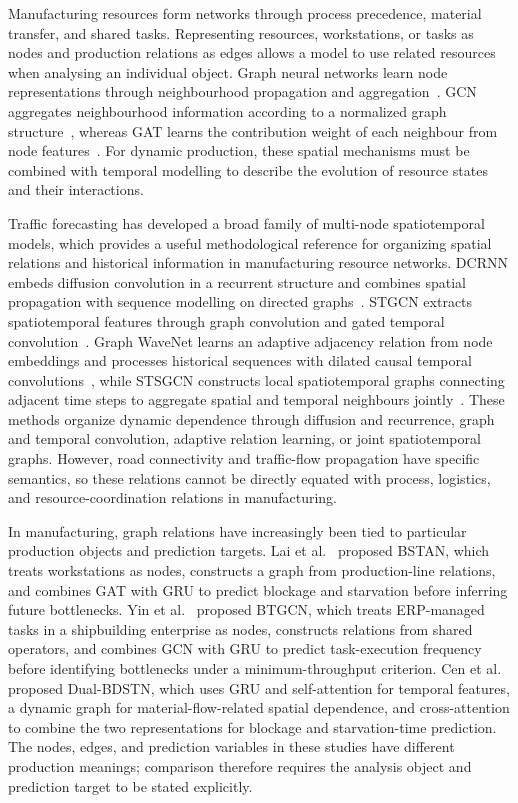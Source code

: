 \documentclass[a4paper,fleqn]{cas-dc}
\begin{document}
Manufacturing resources form networks through process precedence, material transfer, and shared tasks. Representing resources, workstations, or tasks as nodes and production relations as edges allows a model to use related resources when analysing an individual object. Graph neural networks learn node representations through neighbourhood propagation and aggregation~\cite{wu2021gnn}. GCN aggregates neighbourhood information according to a normalized graph structure~\cite{kipf2017gcn}, whereas GAT learns the contribution weight of each neighbour from node features~\cite{velickovic2018gat}. For dynamic production, these spatial mechanisms must be combined with temporal modelling to describe the evolution of resource states and their interactions.


Traffic forecasting has developed a broad family of multi-node spatiotemporal models, which provides a useful methodological reference for organizing spatial relations and historical information in manufacturing resource networks. DCRNN embeds diffusion convolution in a recurrent structure and combines spatial propagation with sequence modelling on directed graphs~\cite{li2018dcrnn}. STGCN extracts spatiotemporal features through graph convolution and gated temporal convolution~\cite{yu2018stgcn}. Graph WaveNet learns an adaptive adjacency relation from node embeddings and processes historical sequences with dilated causal temporal convolutions~\cite{wu2019graphwavenet}, while STSGCN constructs local spatiotemporal graphs connecting adjacent time steps to aggregate spatial and temporal neighbours jointly~\cite{song2020stsgcn}. These methods organize dynamic dependence through diffusion and recurrence, graph and temporal convolution, adaptive relation learning, or joint spatiotemporal graphs. However, road connectivity and traffic-flow propagation have specific semantics, so these relations cannot be directly equated with process, logistics, and resource-coordination relations in manufacturing.


In manufacturing, graph relations have increasingly been tied to particular production objects and prediction targets. Lai et al.~\cite{lai2023bstan} proposed BSTAN, which treats workstations as nodes, constructs a graph from production-line relations, and combines GAT with GRU to predict blockage and starvation before inferring future bottlenecks. Yin et al.~\cite{yin2025btgcn} proposed BTGCN, which treats ERP-managed tasks in a shipbuilding enterprise as nodes, constructs relations from shared operators, and combines GCN with GRU to predict task-execution frequency before identifying bottlenecks under a minimum-throughput criterion. Cen et al.~\cite{cen2025dstnn} proposed Dual-BDSTN, which uses GRU and self-attention for temporal features, a dynamic graph for material-flow-related spatial dependence, and cross-attention to combine the two representations for blockage and starvation-time prediction. The nodes, edges, and prediction variables in these studies have different production meanings; comparison therefore requires the analysis object and prediction target to be stated explicitly.
\end{document}
